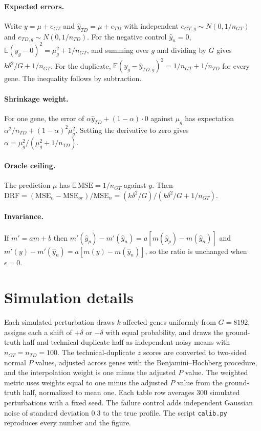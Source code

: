 \documentclass[11pt]{article}
\theoremstyle{definition}
\newcommand{\E}{\mathbb{E}}
\newcommand{\DRF}{\mathrm{DRF}}
\begin{document}
\paragraph{Expected errors.} Write $y=\mu+e_{GT}$ and $\hat y_{TD}=\mu+e_{TD}$ with independent $e_{GT,g}\sim N(0,1/n_{GT})$ and $e_{TD,g}\sim N(0,1/n_{TD})$. For the negative control $\hat y_n=0$, $\E(y_g-0)^2=\mu_g^2+1/n_{GT}$, and summing over $g$ and dividing by $G$ gives $k\delta^2/G+1/n_{GT}$. For the duplicate, $\E(y_g-\hat y_{TD,g})^2=1/n_{GT}+1/n_{TD}$ for every gene. The inequality follows by subtraction.

\paragraph{Shrinkage weight.} For one gene, the error of $\alpha\hat y_{TD}+(1-\alpha)\cdot0$ against $\mu_g$ has expectation $\alpha^2/n_{TD}+(1-\alpha)^2\mu_g^2$. Setting the derivative to zero gives $\alpha=\mu_g^2/(\mu_g^2+1/n_{TD})$.

\paragraph{Oracle ceiling.} The prediction $\mu$ has $\E\,\mathrm{MSE}=1/n_{GT}$ against $y$. Then $\DRF=(\mathrm{MSE}_n-\mathrm{MSE}_{or})/\mathrm{MSE}_n=(k\delta^2/G)/(k\delta^2/G+1/n_{GT})$.

\paragraph{Invariance.} If $m'=am+b$ then $m'(\hat y_p)-m'(\hat y_n)=a[m(\hat y_p)-m(\hat y_n)]$ and $m'(y)-m'(\hat y_n)=a[m(y)-m(\hat y_n)]$, so the ratio is unchanged when $\epsilon=0$.

\section{Simulation details}

Each simulated perturbation draws $k$ affected genes uniformly from $G=8192$, assigns each a shift of $+\delta$ or $-\delta$ with equal probability, and draws the ground-truth half and technical-duplicate half as independent noisy means with $n_{GT}=n_{TD}=100$. The technical-duplicate $z$ scores are converted to two-sided normal $P$ values, adjusted across genes with the Benjamini--Hochberg procedure, and the interpolation weight is one minus the adjusted $P$ value. The weighted metric uses weights equal to one minus the adjusted $P$ value from the ground-truth half, normalized to mean one. Each table row averages 300 simulated perturbations with a fixed seed. The failure control adds independent Gaussian noise of standard deviation $0.3$ to the true profile. The script \texttt{calib.py} reproduces every number and the figure.
\end{document}
